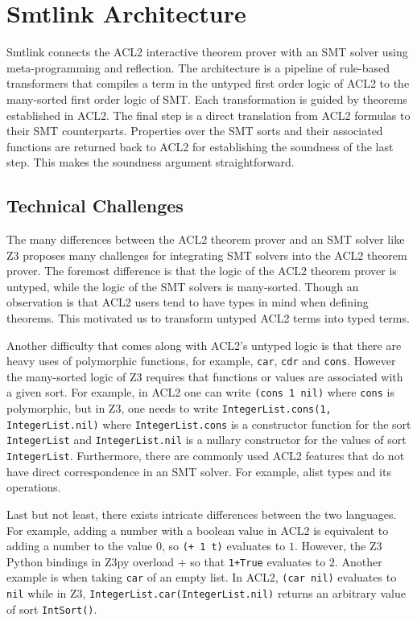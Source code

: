 \chapter{Smtlink Architecture}
\label{ch:smtlink}

Smtlink connects the ACL2 interactive theorem prover with an SMT solver using
meta-programming and reflection. The architecture is a pipeline of rule-based
transformers that compiles a term in the untyped first order logic of ACL2 to
the many-sorted first order logic of SMT. Each transformation is guided by
theorems established in ACL2. The final step is a direct translation from ACL2
formulas to their SMT counterparts. Properties over the SMT sorts and their
associated functions are returned back to ACL2 for establishing the soundness of
the last step. This makes the soundness argument straightforward.

\section{Technical Challenges}
\label{sec:challenges}
The many differences between the ACL2 theorem prover and an SMT solver like Z3
proposes many challenges for integrating SMT solvers into the ACL2 theorem
prover. The foremost difference is that the logic of the ACL2 theorem prover is untyped,
while the logic of the SMT solvers is many-sorted. Though an observation is that
ACL2 users tend to have types in mind when defining theorems. This motivated us
to transform untyped ACL2 terms into typed terms.

Another difficulty that comes along with ACL2's untyped logic is that there are
heavy uses of polymorphic functions, for example, \texttt{car}, \texttt{cdr}
and \texttt{cons}. However the many-sorted logic of Z3 requires that functions
or values are associated with a given sort.
For example, in ACL2 one can write \texttt{(cons 1 nil)} where \texttt{cons}
is polymorphic, but in Z3, one needs to write \texttt{IntegerList.cons(1,
  IntegerList.nil)} where \texttt{IntegerList.cons} is a constructor function
for the sort \texttt{IntegerList} and \texttt{IntegerList.nil} is a nullary
constructor for the values of sort \texttt{IntegerList}.
Furthermore, there are commonly used ACL2 features that do not have direct
correspondence in an SMT solver. For example, alist types and its operations.

Last but not least, there exists intricate differences between the two languages.
For example, adding a number with a boolean value in ACL2 is equivalent to
adding a number to the value 0, so \texttt{(+ 1 t)} evaluates to $1$.
However, the Z3 Python bindings in Z3py overload $+$ so that \texttt{1+True}
evaluates to $2$. Another example is when taking \texttt{car} of an empty list.
In ACL2, \texttt{(car nil)} evaluates to \texttt{nil} while in Z3,
\texttt{IntegerList.car(IntegerList.nil)} returns an arbitrary value of sort
\texttt{IntSort()}.


